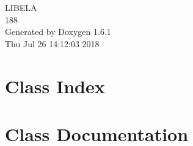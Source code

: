 \documentclass[a4paper]{book}
\begin{document}
\hypersetup{pageanchor=false}
\begin{titlepage}
\vspace*{7cm}
\begin{center}
{\Large LIBELA \\[1ex]\large 188 }\\
\vspace*{1cm}
{\large Generated by Doxygen 1.6.1}\\
\vspace*{0.5cm}
{\small Thu Jul 26 14:12:03 2018}\\
\end{center}
\end{titlepage}
\clearemptydoublepage
{}
\tableofcontents
\clearemptydoublepage
{}
\hypersetup{pageanchor=true}
\chapter{Class Index}

\chapter{Class Documentation}





























\printindex
\end{document}
